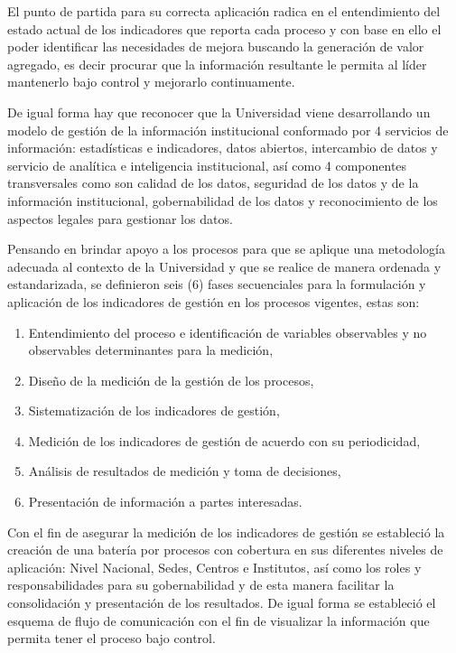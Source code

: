 \documentclass[
]{book}
\begin{document}
El punto de partida para su correcta aplicación radica en el entendimiento del estado actual de los indicadores
que reporta cada proceso y con base en ello el poder identificar las necesidades de mejora buscando la
generación de valor agregado, es decir procurar que la información resultante le permita al líder mantenerlo
bajo control y mejorarlo continuamente.

De igual forma hay que reconocer que la Universidad viene desarrollando un modelo de gestión de la
información institucional conformado por 4 servicios de información: estadísticas e indicadores, datos abiertos,
intercambio de datos y servicio de analítica e inteligencia institucional, así como 4 componentes transversales como son calidad de los datos, seguridad de los datos y de la información institucional, gobernabilidad de los datos y reconocimiento de los aspectos legales para gestionar los datos.

Pensando en brindar apoyo a los procesos para que se aplique una metodología adecuada al contexto de la
Universidad y que se realice de manera ordenada y estandarizada, se definieron seis (6) fases secuenciales para la formulación y aplicación de los indicadores de gestión en los procesos vigentes, estas son:

\begin{enumerate}
\def\labelenumi{\arabic{enumi}.}
\item
  Entendimiento del proceso e identificación de variables observables y no observables determinantes para la medición,
\item
  Diseño de la medición de la gestión de los procesos,
\item
  Sistematización de los indicadores de gestión,
\item
  Medición de los indicadores de gestión de acuerdo con su periodicidad,
\item
  Análisis de resultados de medición y toma de decisiones,
\item
  Presentación de información a partes interesadas.
\end{enumerate}

Con el fin de asegurar la medición de los indicadores de gestión se estableció la creación de una batería por
procesos con cobertura en sus diferentes niveles de aplicación: Nivel Nacional, Sedes, Centros e Institutos, así como los roles y responsabilidades para su gobernabilidad y de esta manera facilitar la consolidación y presentación de los resultados. De igual forma se estableció el esquema de flujo de comunicación con el fin de visualizar la información que permita tener el proceso bajo control.
\end{document}
